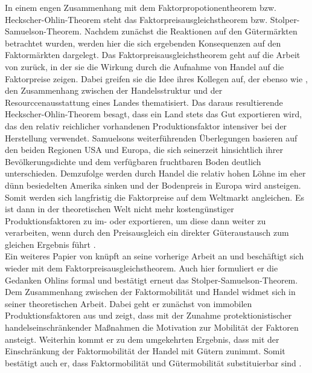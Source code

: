 In einem engen Zusammenhang mit dem Faktorpropotionentheorem bzw. Heckscher-Ohlin-Theorem steht das Faktorpreisausgleichstheorem bzw. Stolper-Samuelson-Theorem. Nachdem zun{\"a}chst die Reaktionen auf den G{\"u}term{\"a}rkten betrachtet wurden, werden hier die sich ergebenden Konsequenzen auf den Faktorm{\"a}rkten dargelegt. Das Faktorpreisausgleichstheorem geht auf die Arbeit von \citet{Samuelson.1941} zur{\"u}ck, in der sie die Wirkung durch die Aufnahme von Handel auf die Faktorpreise zeigen. Dabei greifen sie die Idee ihres Kollegen \citet{Ohlin.1933} auf, der ebenso wie \citet{Heckscher.1919}, den Zusammenhang zwischen der Handelsstruktur und der Resourccenausstattung eines Landes thematisiert. Das daraus resultierende Heckscher-Ohlin-Theorem besagt, dass ein Land stets das Gut exportieren wird, das den relativ reichlicher vorhandenen Produktionsfaktor intensiver bei der Herstellung verwendet. \newline Samuelsons weiterführenden {\"U}berlegungen basieren auf den beiden Regionen USA und Europa, die sich seinerzeit hinsichtlich ihrer Bev{\"o}lkerungsdichte und dem verf{\"u}gbaren fruchtbaren Boden deutlich unterschieden. Demzufolge werden durch Handel die relativ hohen L{\"o}hne im eher d{\"u}nn besiedelten Amerika sinken und der Bodenpreis in Europa  wird ansteigen. Somit werden sich langfristig die Faktorpreise auf dem Weltmarkt angleichen. Es ist dann in der theoretischen Welt nicht mehr kosteng{\"u}nstiger Produktionsfaktoren zu im- oder exportieren, um diese dann weiter zu verarbeiten, wenn durch den Preisausgleich ein direkter G{\"u}teraustausch zum gleichen Ergebnis f{\"u}hrt \citep{Samuelson.1948}.\\
Ein weiteres Papier von \citet{Samuelson.1949} kn{\"u}pft an seine vorherige Arbeit an und besch{\"a}ftigt sich wieder mit dem Faktorpreisausgleichstheorem. Auch hier formuliert er die Gedanken Ohlins formal und best{\"a}tigt erneut das Stolper-Samuelson-Theorem.\\


Dem Zusammenhang zwischen der Faktormobilit{\"a}t und Handel widmet sich \citet{Mundell.1957} in seiner theoretischen Arbeit. Dabei geht er zun{\"a}chst von immobilen Produktionsfaktoren aus und zeigt, dass mit der Zunahme protektionistischer handelseinschr{\"a}nkender Ma{\ss}nahmen die Motivation zur Mobilit{\"a}t der Faktoren ansteigt. Weiterhin kommt er zu dem umgekehrten Ergebnis, dass mit der Einschr{\"a}nkung der Faktormobilit{\"a}t der Handel mit G{\"u}tern zunimmt. Somit best{\"a}tigt auch er, dass Faktormobilit{\"a}t und G{\"u}termobilit{\"a}t substituierbar sind \citep{Mundell.1957}.\\


